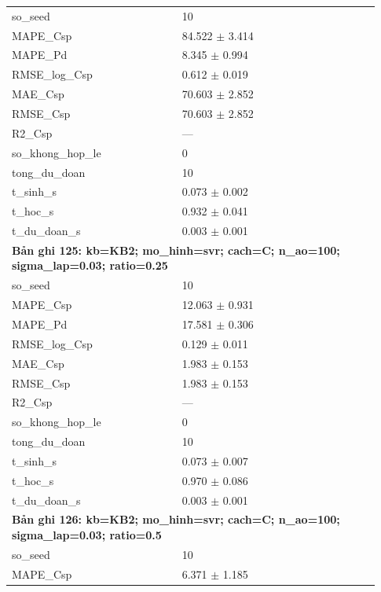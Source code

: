 \begin{longtable}{p{0.43\linewidth}p{0.50\linewidth}}
so\_\allowbreak seed & 10 \\
MAPE\_\allowbreak Csp & 84.522 $\pm$ 3.414 \\
MAPE\_\allowbreak Pd & 8.345 $\pm$ 0.994 \\
RMSE\_\allowbreak log\_\allowbreak Csp & 0.612 $\pm$ 0.019 \\
MAE\_\allowbreak Csp & 70.603 $\pm$ 2.852 \\
RMSE\_\allowbreak Csp & 70.603 $\pm$ 2.852 \\
R2\_\allowbreak Csp & — \\
so\_\allowbreak khong\_\allowbreak hop\_\allowbreak le & 0 \\
tong\_\allowbreak du\_\allowbreak doan & 10 \\
t\_\allowbreak sinh\_\allowbreak s & 0.073 $\pm$ 0.002 \\
t\_\allowbreak hoc\_\allowbreak s & 0.932 $\pm$ 0.041 \\
t\_\allowbreak du\_\allowbreak doan\_\allowbreak s & 0.003 $\pm$ 0.001 \\
\midrule
\multicolumn{2}{p{0.95\linewidth}}{\textbf{Bản ghi 125: kb=KB2; mo\_hinh=svr; cach=C; n\_ao=100; sigma\_lap=0.03; ratio=0.25}} \\
so\_\allowbreak seed & 10 \\
MAPE\_\allowbreak Csp & 12.063 $\pm$ 0.931 \\
MAPE\_\allowbreak Pd & 17.581 $\pm$ 0.306 \\
RMSE\_\allowbreak log\_\allowbreak Csp & 0.129 $\pm$ 0.011 \\
MAE\_\allowbreak Csp & 1.983 $\pm$ 0.153 \\
RMSE\_\allowbreak Csp & 1.983 $\pm$ 0.153 \\
R2\_\allowbreak Csp & — \\
so\_\allowbreak khong\_\allowbreak hop\_\allowbreak le & 0 \\
tong\_\allowbreak du\_\allowbreak doan & 10 \\
t\_\allowbreak sinh\_\allowbreak s & 0.073 $\pm$ 0.007 \\
t\_\allowbreak hoc\_\allowbreak s & 0.970 $\pm$ 0.086 \\
t\_\allowbreak du\_\allowbreak doan\_\allowbreak s & 0.003 $\pm$ 0.001 \\
\midrule
\multicolumn{2}{p{0.95\linewidth}}{\textbf{Bản ghi 126: kb=KB2; mo\_hinh=svr; cach=C; n\_ao=100; sigma\_lap=0.03; ratio=0.5}} \\
so\_\allowbreak seed & 10 \\
MAPE\_\allowbreak Csp & 6.371 $\pm$ 1.185 \\

\end{longtable}
